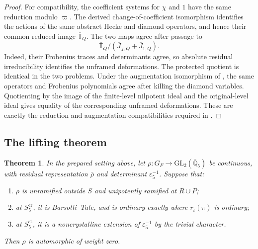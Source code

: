\documentclass[11pt,a4paper]{article}
\newtheorem{theorem}{Theorem}[section]
\numberwithin{equation}{section}
\begin{document}
\begin{proof}
For compatibility, the coefficient systems for \(\chi\) and \(1\) have the same reduction modulo \(\varpi\). The derived change-of-coefficient isomorphism identifies the actions of the same abstract Hecke and diamond operators, and hence their common reduced image \(\overline{\mathbb T}_Q\). The two maps agree after passage to
\begin{equation*}
\overline{\mathbb T}_Q/
(\overline J_{\chi,Q}+\overline J_{1,Q}).
\end{equation*}
Indeed, their Frobenius traces and determinants agree, so absolute residual irreducibility identifies the unframed deformations. The protected quotient is identical in the two problems. Under the augmentation isomorphism of \cite[Lemma~5.6.4]{CN}, the same operators and Frobenius polynomials agree after killing the diamond variables. Quotienting by the image of the finite-level nilpotent ideal and the original-level ideal gives equality of the corresponding unframed deformations. These are exactly the reduction and augmentation compatibilities required in \cite[\S6.4.1, (5) and the subsequent augmentation conditions]{ACC}.
\end{proof}

\subsection*{The lifting theorem}

\begin{theorem}\label{thm:4.2}
In the prepared setting above, let \(\rho:G_F\to\mathrm{GL}_2(\overline{\mathbb Q}_5)\) be continuous, with residual representation \(\bar\rho\) and determinant \(\varepsilon_5^{-1}\). Suppose that:
\begin{enumerate}[label=\arabic*.]
\item \(\rho\) is unramified outside \(S\) and unipotently ramified at \(R\cup P\);

\item at \(S_5^{\mathrm{cr}}\), it is Barsotti--Tate, and is ordinary exactly where \(r_\iota(\pi)\) is ordinary;

\item at \(S_5^{\mathrm{st}}\), it is a noncrystalline extension of \(\varepsilon_5^{-1}\) by the trivial character.
\end{enumerate}

Then \(\rho\) is automorphic of weight zero.
\end{theorem}
\end{document}
